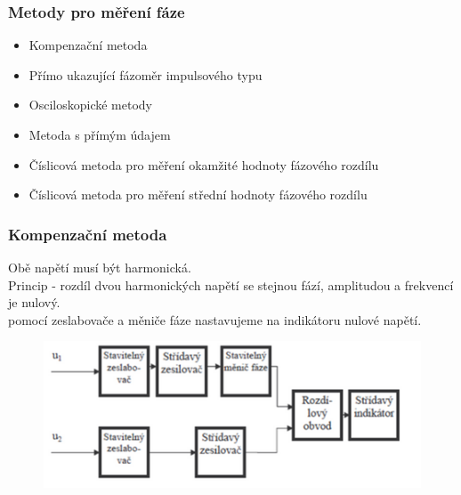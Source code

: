 \subsubsection*{Metody pro měření fáze}
\begin{itemize}
    \item Kompenzační metoda 
    \item Přímo ukazující fázoměr impulsového typu
    \item Osciloskopické metody 
    \item Metoda s přímým údajem 
    \item Číslicová metoda pro měření okamžité hodnoty fázového rozdílu 
    \item Číslicová metoda pro měření střední hodnoty fázového rozdílu
\end{itemize}

\subsubsection*{Kompenzační metoda}
Obě napětí musí být harmonická.\\
Princip - rozdíl dvou harmonických napětí se stejnou fází, amplitudou a frekvencí je nulový.\\
pomocí zeslabovače a měniče fáze nastavujeme na indikátoru nulové napětí.\\
\begin{figure}[H]
    \includegraphics*[scale = 1]{images/fazeKompenzacni.png}
\end{figure}


